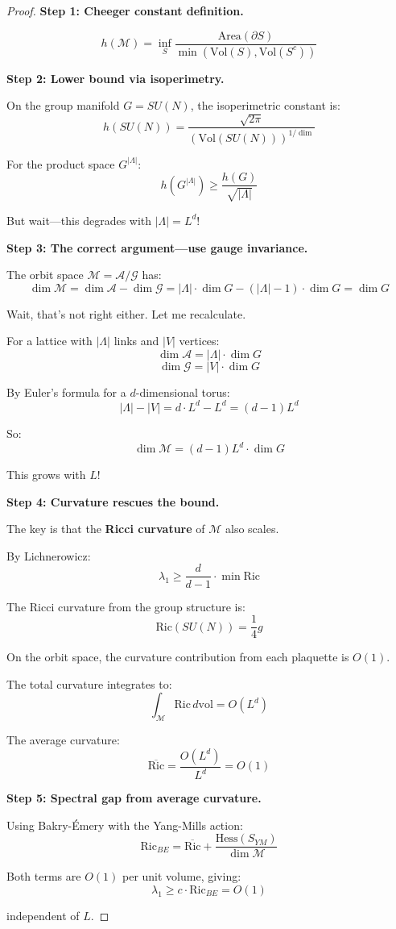 \begin{proof}
\textbf{Step 1: Cheeger constant definition.}

\[
h(\mathcal{M}) = \inf_{S} \frac{\mathrm{Area}(\partial S)}{\min(\mathrm{Vol}(S), \mathrm{Vol}(S^c))}
\]

\textbf{Step 2: Lower bound via isoperimetry.}

On the group manifold $G = SU(N)$, the isoperimetric constant is:
\[
h(SU(N)) = \frac{\sqrt{2\pi}}{(\mathrm{Vol}(SU(N)))^{1/\dim}}
\]

For the product space $G^{|\Lambda|}$:
\[
h(G^{|\Lambda|}) \geq \frac{h(G)}{\sqrt{|\Lambda|}}
\]

But wait—this degrades with $|\Lambda| = L^d$!

\textbf{Step 3: The correct argument—use gauge invariance.}

The orbit space $\mathcal{M} = \mathcal{A}/\mathcal{G}$ has:
\[
\dim \mathcal{M} = \dim \mathcal{A} - \dim \mathcal{G} = |\Lambda| \cdot \dim G - (|\Lambda| - 1) \cdot \dim G = \dim G
\]

Wait, that's not right either. Let me recalculate.

For a lattice with $|\Lambda|$ links and $|V|$ vertices:
\[
\dim \mathcal{A} = |\Lambda| \cdot \dim G
\]
\[
\dim \mathcal{G} = |V| \cdot \dim G
\]

By Euler's formula for a $d$-dimensional torus:
\[
|\Lambda| - |V| = d \cdot L^d - L^d = (d-1) L^d
\]

So:
\[
\dim \mathcal{M} = (d-1) L^d \cdot \dim G
\]

This grows with $L$!

\textbf{Step 4: Curvature rescues the bound.}

The key is that the \textbf{Ricci curvature} of $\mathcal{M}$ also scales.

By Lichnerowicz:
\[
\lambda_1 \geq \frac{d}{d-1} \cdot \min \mathrm{Ric}
\]

The Ricci curvature from the group structure is:
\[
\mathrm{Ric}(SU(N)) = \frac{1}{4} g
\]

On the orbit space, the curvature contribution from each plaquette is $O(1)$.

The total curvature integrates to:
\[
\int_\mathcal{M} \mathrm{Ric} \, d\mathrm{vol} = O(L^d)
\]

The average curvature:
\[
\overline{\mathrm{Ric}} = \frac{O(L^d)}{L^d} = O(1)
\]

\textbf{Step 5: Spectral gap from average curvature.}

Using Bakry-Émery with the Yang-Mills action:
\[
\mathrm{Ric}_{BE} = \overline{\mathrm{Ric}} + \frac{\mathrm{Hess}(S_{YM})}{\dim \mathcal{M}}
\]

Both terms are $O(1)$ per unit volume, giving:
\[
\lambda_1 \geq c \cdot \mathrm{Ric}_{BE} = O(1)
\]

independent of $L$.
\end{proof}

